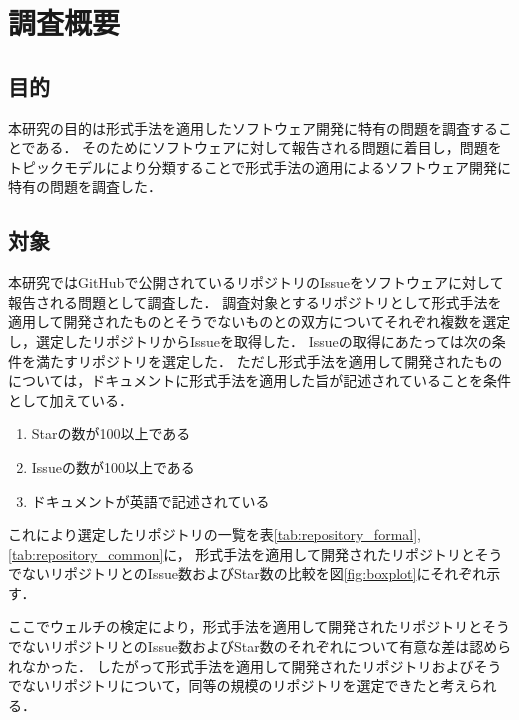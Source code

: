 \documentclass[main]{subfiles}
\begin{document}
\chapter{調査概要}

\section{目的}

本研究の目的は形式手法を適用したソフトウェア開発に特有の問題を調査することである．
そのためにソフトウェアに対して報告される問題に着目し，問題をトピックモデルにより分類することで形式手法の適用によるソフトウェア開発に特有の問題を調査した．


\section{対象}
\label{sec:survey-target}

本研究ではGitHubで公開されているリポジトリのIssueをソフトウェアに対して報告される問題として調査した．
調査対象とするリポジトリとして形式手法を適用して開発されたものとそうでないものとの双方についてそれぞれ複数を選定し，選定したリポジトリからIssueを取得した．
Issueの取得にあたっては次の条件を満たすリポジトリを選定した．
ただし形式手法を適用して開発されたものについては，ドキュメントに形式手法を適用した旨が記述されていることを条件として加えている．

\begin{enumerate}
	\item Starの数が100以上である
	\item Issueの数が100以上である
	\item ドキュメントが英語で記述されている
\end{enumerate}

これにより選定したリポジトリの一覧を表\ref{tab:repository_formal}, \ref{tab:repository_common}に，
形式手法を適用して開発されたリポジトリとそうでないリポジトリとのIssue数およびStar数の比較を図\ref{fig:boxplot}にそれぞれ示す．

ここでウェルチの検定により，形式手法を適用して開発されたリポジトリとそうでないリポジトリとのIssue数およびStar数のそれぞれについて有意な差は認められなかった．
したがって形式手法を適用して開発されたリポジトリおよびそうでないリポジトリについて，同等の規模のリポジトリを選定できたと考えられる．


\end{document}
